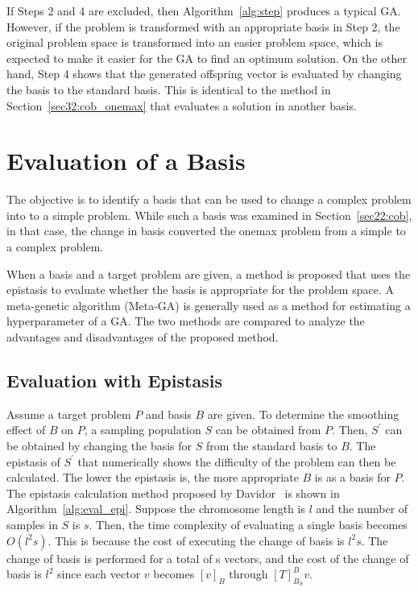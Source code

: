 If Steps 2 and 4 are excluded, then Algorithm~\ref{alg:step} produces a typical GA. However, if the problem is transformed with an appropriate basis in Step 2, the original problem space is transformed into an easier problem space, which is expected to make it easier for the GA to find an optimum solution. On the other hand, Step 4 shows that the generated offspring vector is evaluated by changing the basis to the standard basis. This is identical to the method in Section~\ref{sec32:cob_onemax} that evaluates a solution in another basis.


\section{Evaluation of a Basis} \label{sec4:eval_basis}
The objective is to identify a basis that can be used to change a complex problem into to a simple problem. While such a basis was examined in Section~\ref{sec22:cob}, in that case, the change in basis converted the onemax problem from a simple to a complex problem.

When a basis and a target problem are given, a method is proposed that uses the epistasis to evaluate whether the basis is appropriate for the problem space. A meta-genetic algorithm (Meta-GA) is generally used as a method for estimating a hyperparameter of a GA. The two methods are compared to analyze the advantages and disadvantages of the proposed method.

\subsection{Evaluation with Epistasis}
Assume a target problem $ P $ and basis $ B $ are given. To determine the smoothing effect of $ B $ on $ P $, a sampling population $ S $ can be obtained from $ P $. Then, $ S^\prime $ can be obtained by changing the basis for $ S $ from the standard basis to $ B $. The epistasis of $ S^\prime $ that numerically shows the difficulty of the problem can then be calculated. The lower the epistasis is, the more appropriate $ B $ is as a basis for $ P $. The epistasis calculation method proposed by Davidor~\cite{davidor1990epistasis} is shown in Algorithm~\ref{alg:eval_epi}. Suppose the chromosome length is $ l $ and the number of samples in $ S $ is $ s $. Then, the time complexity of evaluating a single basis becomes $ O\left(l^2s\right) $. This is because the cost of executing the change of basis is $ l^2s $. The change of basis is performed for a total of s vectors, and the cost of the change of basis is $ l^2 $ since each vector $ v $ becomes $ \left[v\right]_B $ through $ \left[T\right]_{B_S}^Bv $. 


